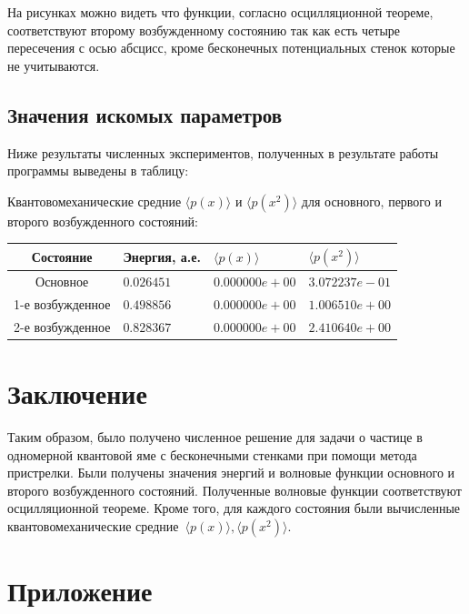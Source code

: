 \documentclass[a4paper,12pt]{article}
\begin{document}
На рисунках можно видеть что функции, согласно осцилляционной теореме, соответствуют второму возбужденному состоянию так как есть четыре пересечения с осью абсцисс,
кроме бесконечных потенциальных стенок которые не учитываются.

\subsection{Значения искомых параметров}\label{subsec:results_values}

Ниже результаты численных экспериментов, полученных в результате работы программы выведены в таблицу:

Квантовомеханические средние $\langle p(x) \rangle$ и $\langle p(x^2) \rangle$ для основного, первого и второго возбужденного состояний:


\noindent
\begin{tabularx}{\linewidth}{|c|X|X|X|}
    \hline
    \textbf{Состояние}&\textbf{Энергия, а.е.}&\textbf{$\langle p(x) \rangle$}&\textbf{$\langle p(x^2) \rangle$} \\
    \hline
    Основное & $0.026451$ & $0.000000e+00$ & $3.072237e-01$\\
    \hline
    1-е возбужденное & $0.498856$ & $0.000000e+00$ & $1.006510e+00$\\
    \hline
    2-е возбужденное & $0.828367$ & $0.000000e+00$ & $2.410640e+00$\\
    \hline
\end{tabularx}

\newpage

\section{Заключение}\label{sec:zakl}

Таким образом, было получено численное решение для задачи о частице в одномерной квантовой яме с бесконечными стенками при помощи метода пристрелки.
Были получены значения энергий и волновые функции основного и второго возбужденного состояний.
Полученные волновые функции соответствуют осцилляционной теореме.
Кроме того, для каждого состояния были вычисленные квантовомеханические средние~$\langle p(x) \rangle, \langle p(x^2) \rangle$.

\newpage

\appendix

\section*{Приложение}\label{sec:extras}
\end{document}
